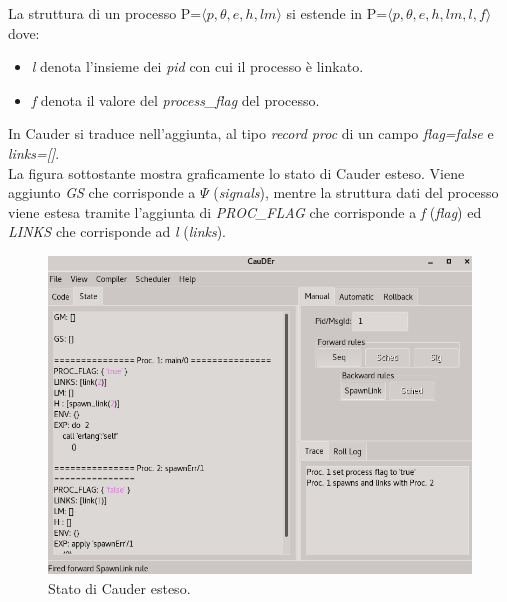 \documentclass[Contributo.tex]{subfiles}
\begin{document}
La struttura di un processo P=$\displaystyle \langle p,\theta,e,h,lm \rangle$ si estende in P=$\displaystyle \langle p,\theta,e,h,lm,l,f \rangle$ dove:
	\begin{itemize}
		\item \textit{l} denota l'insieme dei \textit{pid} con cui il processo è linkato.
		\item \textit{f} denota il valore del \textit{process\_flag} del processo.
	\end{itemize}
In Cauder si traduce nell'aggiunta, al tipo \textit{record proc} di un campo \textit{flag=false} e \textit{links=[]}.\\
La figura sottostante mostra graficamente lo stato di Cauder esteso. Viene aggiunto \textit{GS} che corrisponde a $\Psi$ (\textit{signals}), mentre la struttura dati del processo viene estesa tramite l'aggiunta di \textit{PROC\_FLAG} che corrisponde a \textit{f} (\textit{flag}) ed \textit{LINKS} che corrisponde ad \textit{l} (\textit{links}).
\begin{figure}[H]
		\centerline{\includegraphics[scale=0.5]{./LavoroLuca/EstensioneCauder/Imgs/CauderStatoEsteso}}
		\caption{Stato di Cauder esteso.}
		\label{fig4}
	\end{figure}
\end{document}
